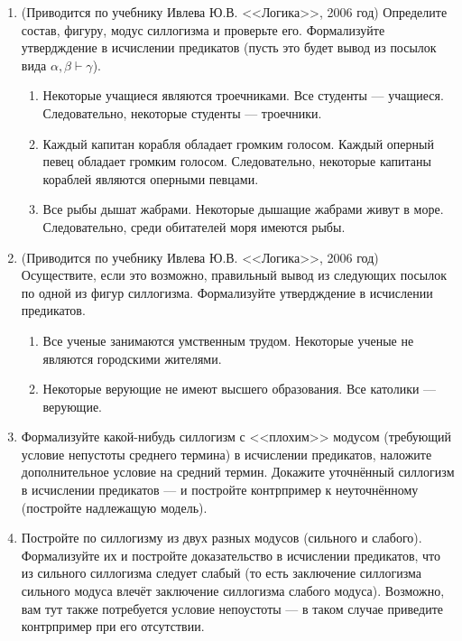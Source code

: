 \documentclass[10pt,a4paper,oneside]{article}
\begin{document}
\begin{enumerate}
\item (Приводится по учебнику Ивлева Ю.В. <<Логика>>, 2006 год) Определите состав, фигуру, модус силлогизма и проверьте его.
Формализуйте утвердждение в исчислении предикатов (пусть это будет вывод из посылок вида $\alpha,\beta\vdash\gamma$).
\begin{enumerate}
\item Некоторые учащиеся являются троечниками. Все студенты --- учащиеся. Следовательно, некоторые студенты --- троечники.
\item Каждый капитан корабля обладает громким голосом. Каждый оперный певец обладает громким голосом. Следовательно, некоторые капитаны кораблей являются оперными певцами.
\item Все рыбы дышат жабрами. Некоторые дышащие жабрами живут в море. Следовательно, среди обитателей моря имеются рыбы.
\end{enumerate}
\item (Приводится по учебнику Ивлева Ю.В. <<Логика>>, 2006 год) Осуществите, если это возможно, правильный вывод из следующих посылок по одной из фигур силлогизма. 
Формализуйте утвердждение в исчислении предикатов.
\begin{enumerate}
\item Все ученые занимаются умственным трудом. Некоторые ученые не являются городскими жителями.
\item Некоторые верующие не имеют высшего образования. Все католики --- верующие.
\end{enumerate}
\item Формализуйте какой-нибудь силлогизм с <<плохим>> модусом (требующий условие непустоты среднего термина) в исчислении предикатов, наложите дополнительное условие
на средний термин. Докажите уточнённый силлогизм в исчислении предикатов --- и постройте контрпример к неуточнённому (постройте надлежащую модель).
\item Постройте по силлогизму из двух разных модусов (сильного и слабого). Формализуйте их и постройте доказательство в исчислении предикатов, что из сильного силлогизма следует слабый 
(то есть заключение силлогизма сильного модуса влечёт заключение силлогизма слабого модуса). Возможно, вам тут также потребуется условие непоустоты --- в таком
случае приведите контрпример при его отсутствии.


\end{enumerate}
\end{document}

